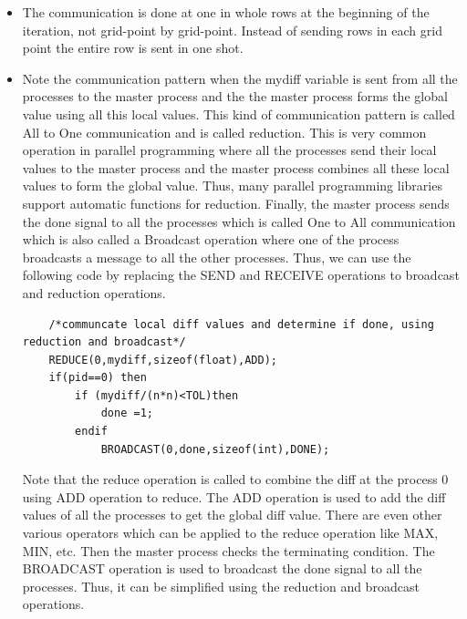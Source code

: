 \documentclass[12pt]{article}
\begin{document}
\begin{itemize}
    \item The communication is done at one in whole rows at the beginning of the iteration, not grid-point by grid-point. Instead of sending rows in each grid point the entire row is sent in one shot.
    \item Note the communication pattern when the mydiff variable is sent from all the processes to the master process and the the master process forms the global value using all this local values. This kind of communication pattern is called All to One communication and is called reduction.
    This is very common operation in parallel programming where all the processes send their local values to the master process and the master process combines all these local values to form the global value. Thus, many parallel programming libraries support automatic functions for reduction.
    Finally, the master process sends the done signal to all the processes which is called One to All communication which is also called a Broadcast operation where one of the process broadcasts a message to all the other processes.
    Thus, we can use the following code by replacing the SEND and RECEIVE operations to broadcast and reduction operations.
    \begin{lstlisting}
    /*communcate local diff values and determine if done, using reduction and broadcast*/
    REDUCE(0,mydiff,sizeof(float),ADD);
    if(pid==0) then
        if (mydiff/(n*n)<TOL)then
            done =1;
        endif
            BROADCAST(0,done,sizeof(int),DONE);
    \end{lstlisting}
    Note that the reduce operation is called to combine the diff at the process 0 using ADD operation to reduce. The ADD operation is used to add the diff values of all the processes to get the global diff value.
    There are even other various operators which can be applied to the reduce operation like MAX, MIN, etc. Then the master process checks the terminating condition. The BROADCAST operation is used to broadcast the done signal to all the processes.
    Thus, it can be simplified using the reduction and broadcast operations.
\end{itemize}
\end{document}
